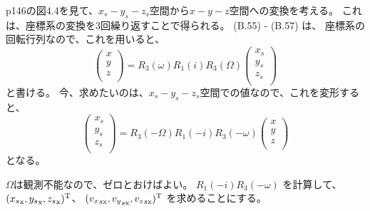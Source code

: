 p146の図4.4を見て、$x_s-y_s-z_s$空間から$x-y-z$空間への変換を考える。
これは、座標系の変換を3回繰り返すことで得られる。
(B.55) - (B.57) は、 座標系の回転行列なので、これを用いると、
\begin{equation}
\left( \begin{array}{c}
x \\
y \\
z \\
\end{array}
\right)
= R_3(\omega) R_1(i) R_3(\Omega)
\left( \begin{array}{c}
x_s \\
y_s \\
z_s \\
\end{array}
\right)
\end{equation}
と書ける。
今、求めたいのは、$x_s-y_s-z_s$空間での値なので、これを変形すると、
\begin{equation}
\left( \begin{array}{c}
x_s \\
y_s \\
z_s \\
\end{array}
\right)
= R_3(-\Omega) R_1(-i) R_3(-\omega) 
\left( \begin{array}{c}
x \\
y \\
z \\
\end{array}
\right)
\end{equation}
となる。

$\Omega$は観測不能なので、ゼロとおけばよい。
$R_1(-i) R_3(-\omega)$ を計算して、
$({x_s}_{\rm x}, {y_s}_{\rm x}, {z_s}_{\rm x})^{\rm T}$、
$({v_x}_{s \rm x}, {v_y}_{s \rm x}, {v_z}_{s \rm x})^{\rm T}$
を求めることにする。

